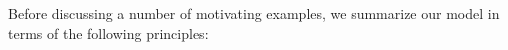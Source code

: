 \documentclass[sigconf]{acmart}
\newcommand{\marten}[1]{\mynote{Marten}{#1}{cyan}}%
\begin{document}






   





Before discussing a number of motivating examples, we summarize our model in terms of the following principles:
\end{document}
